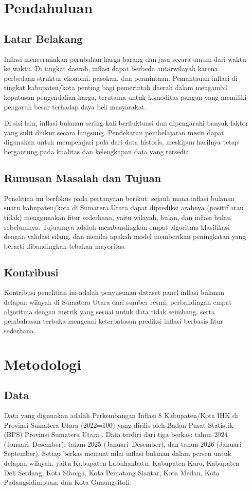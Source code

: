 \documentclass[conference]{IEEEtran}
\begin{document}
\section{Pendahuluan}
\subsection{Latar Belakang}
Inflasi mencerminkan perubahan harga barang dan jasa secara umum dari waktu ke waktu. Di tingkat daerah, inflasi dapat berbeda antarwilayah karena perbedaan struktur ekonomi, pasokan, dan permintaan. Pemantauan inflasi di tingkat kabupaten/kota penting bagi pemerintah daerah dalam mengambil keputusan pengendalian harga, terutama untuk komoditas pangan yang memiliki pengaruh besar terhadap daya beli masyarakat.

Di sisi lain, inflasi bulanan sering kali berfluktuasi dan dipengaruhi banyak faktor yang sulit diukur secara langsung. Pendekatan pembelajaran mesin dapat digunakan untuk mempelajari pola dari data historis, meskipun hasilnya tetap bergantung pada kualitas dan kelengkapan data yang tersedia.

\subsection{Rumusan Masalah dan Tujuan}
Penelitian ini berfokus pada pertanyaan berikut: sejauh mana inflasi bulanan suatu kabupaten/kota di Sumatera Utara dapat diprediksi arahnya (positif atau tidak) menggunakan fitur sederhana, yaitu wilayah, bulan, dan inflasi bulan sebelumnya. Tujuannya adalah membandingkan empat algoritma klasifikasi dengan validasi silang, dan menilai apakah model memberikan peningkatan yang berarti dibandingkan tebakan mayoritas.

\subsection{Kontribusi}
Kontribusi penelitian ini adalah penyusunan dataset panel inflasi bulanan delapan wilayah di Sumatera Utara dari sumber resmi, perbandingan empat algoritma dengan metrik yang sesuai untuk data tidak seimbang, serta pembahasan terbuka mengenai keterbatasan prediksi inflasi berbasis fitur sederhana.

\section{Metodologi}
\subsection{Data}
Data yang digunakan adalah Perkembangan Inflasi 8 Kabupaten/Kota IHK di Provinsi Sumatera Utara (2022=100) yang dirilis oleh Badan Pusat Statistik (BPS) Provinsi Sumatera Utara \cite{bps}. Data terdiri dari tiga berkas: tahun 2024 (Januari--Desember), tahun 2025 (Januari--Desember), dan tahun 2026 (Januari--September). Setiap berkas memuat nilai inflasi bulanan dalam persen untuk delapan wilayah, yaitu Kabupaten Labuhanbatu, Kabupaten Karo, Kabupaten Deli Serdang, Kota Sibolga, Kota Pematang Siantar, Kota Medan, Kota Padangsidimpuan, dan Kota Gunungsitoli.
\end{document}
